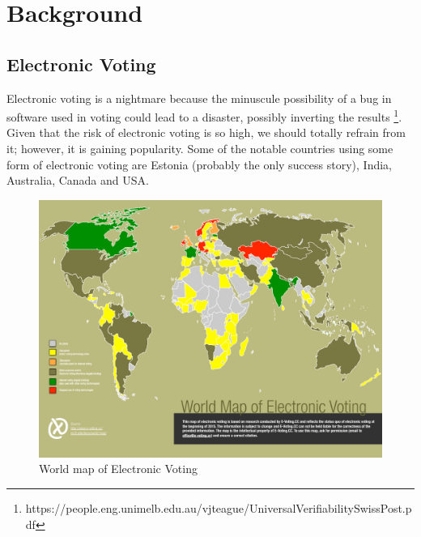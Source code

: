 \chapter{Background}
\label{cha:background}


\section{Electronic Voting}
   Electronic voting is a nightmare because the minuscule possibility of 
   a bug in software used in voting could lead to a disaster, possibly 
   inverting the results
   \footnote{https://people.eng.unimelb.edu.au/vjteague/UniversalVerifiabilitySwissPost.pdf}.
   Given that the risk of  electronic voting is 
   so high, we should totally refrain from it; however,
   it is gaining popularity. Some of the notable countries using some form
   of electronic voting are Estonia (probably the only success story), India,
   Australia, Canada and USA. 
    \begin{figure}[htb]
	\begin{center}
	\includegraphics[scale=0.5]{e-voting_worldmap_2015.pdf}
	\caption{World map of Electronic Voting}
	\label{fig:world_electronic_voting_map}
	\end{center}
  \end{figure}  
   
